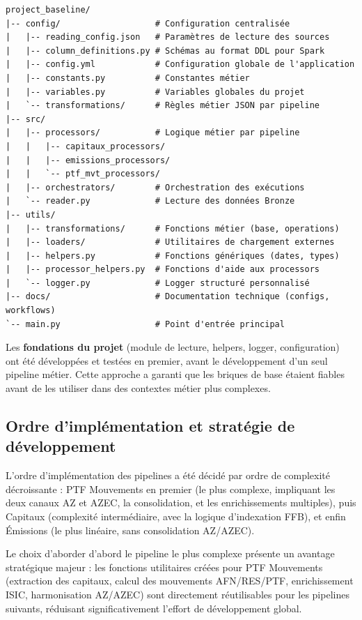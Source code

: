 \begin{verbatim}
project_baseline/
|-- config/                   # Configuration centralisée
|   |-- reading_config.json   # Paramètres de lecture des sources
|   |-- column_definitions.py # Schémas au format DDL pour Spark
|   |-- config.yml            # Configuration globale de l'application
|   |-- constants.py          # Constantes métier
|   |-- variables.py          # Variables globales du projet
|   `-- transformations/      # Règles métier JSON par pipeline
|-- src/
|   |-- processors/           # Logique métier par pipeline
|   |   |-- capitaux_processors/
|   |   |-- emissions_processors/
|   |   `-- ptf_mvt_processors/
|   |-- orchestrators/        # Orchestration des exécutions
|   `-- reader.py             # Lecture des données Bronze
|-- utils/
|   |-- transformations/      # Fonctions métier (base, operations)
|   |-- loaders/              # Utilitaires de chargement externes
|   |-- helpers.py            # Fonctions génériques (dates, types)
|   |-- processor_helpers.py  # Fonctions d'aide aux processors
|   `-- logger.py             # Logger structuré personnalisé
|-- docs/                     # Documentation technique (configs, workflows)
`-- main.py                   # Point d'entrée principal
\end{verbatim}

Les \textbf{fondations du projet} (module de lecture, helpers, logger, configuration) ont été développées et testées en premier, avant le développement d'un seul pipeline métier. Cette approche a garanti que les briques de base étaient fiables avant de les utiliser dans des contextes métier plus complexes.

\subsection{Ordre d'implémentation et stratégie de développement}

L'ordre d'implémentation des pipelines a été décidé par ordre de complexité décroissante : PTF Mouvements en premier (le plus complexe, impliquant les deux canaux AZ et AZEC, la consolidation, et les enrichissements multiples), puis Capitaux (complexité intermédiaire, avec la logique d'indexation FFB), et enfin Émissions (le plus linéaire, sans consolidation AZ/AZEC).

Le choix d'aborder d'abord le pipeline le plus complexe présente un avantage stratégique majeur : les fonctions utilitaires créées pour PTF Mouvements (extraction des capitaux, calcul des mouvements AFN/RES/PTF, enrichissement ISIC, harmonisation AZ/AZEC) sont directement réutilisables pour les pipelines suivants, réduisant significativement l'effort de développement global.

